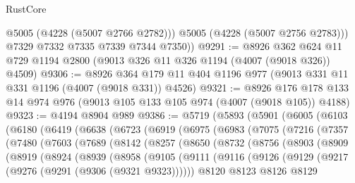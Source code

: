 \begin{lexlean}{RustCore}
\begin{coremodule}
            @5005
            (@4228 (@5007 @2766 @2782)))
          @5005
          (@4228 (@5007 @2756 @2783)))
        @7329
        @7332
        @7335
        @7339
        @7344
        @7350))
@9291 := @8926 @362 @624 @11 @729 @1194 @2800 (@9013 @326 @11 @326 @1194 (@4007 (@9018 @326)) @4509)
@9306 := @8926 @364 @179 @11 @404 @1196 @977 (@9013 @331 @11 @331 @1196 (@4007 (@9018 @331)) @4526)
@9321 := @8926 @176 @178 @133 @14 @974 @976 (@9013 @105 @133 @105 @974 (@4007 (@9018 @105)) @4188)
@9323 := @4194 @8904 @989
@9386 := @5719
    (@5893
      (@5901
        (@6005
          (@6103
            (@6180
              (@6419
                (@6638
                  (@6723
                    (@6919
                      (@6975
                        (@6983
                          (@7075
                            (@7216
                              (@7357
                                (@7480
                                  (@7603
                                    (@7689
                                      (@8142
                                        (@8257
                                          (@8650
                                            (@8732
                                              (@8756
                                                (@8903
                                                  (@8909
                                                    (@8919
                                                      (@8924
                                                        (@8939
                                                          (@8958
                                                            (@9105
                                                              (@9111
                                                                (@9116
                                                                  (@9126
                                                                    (@9129
                                                                      (@9217
                                                                        (@9276
                                                                          (@9291
                                                                            (@9306
                                                                              (@9321 @9323))))))
                                                                    @8120
                                                                    @8123
                                                                    @8126
                                                                    @8129

\end{coremodule}
\end{lexlean}

